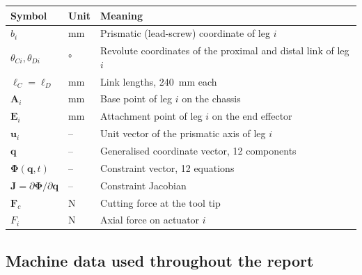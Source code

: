 \documentclass[11pt]{article}
\begin{document}
\begin{center}
\begin{tabular}{@{}ll>{\raggedright\arraybackslash}p{7.2cm}@{}}
\toprule
\textbf{Symbol} & \textbf{Unit} & \textbf{Meaning} \\
\midrule
$b_i$                  & \si{\milli\metre}        & Prismatic (lead-screw) coordinate of leg $i$ \\
$\theta_{Ci},\theta_{Di}$ & \si{\degree}          & Revolute coordinates of the proximal and distal link of leg $i$ \\
$\ell_C=\ell_D$        & \si{\milli\metre}        & Link lengths, \SI{240}{\milli\metre} each \\
$\bm A_i$              & \si{\milli\metre}        & Base point of leg $i$ on the chassis \\
$\bm E_i$              & \si{\milli\metre}        & Attachment point of leg $i$ on the end effector \\
$\bm u_i$              & --                       & Unit vector of the prismatic axis of leg $i$ \\
$\bm q$                & --                       & Generalised coordinate vector, 12 components \\
$\bm\Phi(\bm q,t)$     & --                       & Constraint vector, 12 equations \\
$\bm J=\partial\bm\Phi/\partial\bm q$ & --         & Constraint Jacobian \\
$\bm F_c$              & \si{\newton}             & Cutting force at the tool tip \\
$F_i$                  & \si{\newton}             & Axial force on actuator $i$ \\
\bottomrule
\end{tabular}
\end{center}

\subsection{Machine data used throughout the report}
\end{document}
